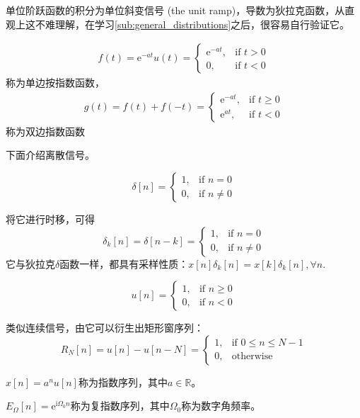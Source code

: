 \documentclass{ctexbook}
\begin{document}
单位阶跃函数的积分为单位斜变信号 (the unit ramp)，导数为狄拉克函数，从直观上这不难理解，在学习\ref{sub:general_distributions}之后，很容易自行验证它。

\begin{definition}[单边指数函数和双边指数函数]
    \begin{align*}
    f(t)=\mathrm{e}^{-at}u(t)=\begin{cases}
        \mathrm{e}^{-at}, & \text{if }t>0 \\
        0,       & \text{if }t<0
    \end{cases}
\end{align*}
称为单边按指数函数，
\begin{align*}g(t)=f(t)+f(-t)=\begin{cases}
        \mathrm{e}^{-at}, & \text{if }t\geq 0 \\
        \mathrm{e}^{at},  & \text{if }t<0
    \end{cases}
\end{align*}
称为双边指数函数
\end{definition}

下面介绍离散信号。
\begin{definition}
    \[\delta[n]=\begin{cases}
        1, & \text{if }n=0     \\
        0, & \text{if }n\neq 0
    \end{cases}\]
\end{definition}
将它进行时移，可得\[\delta_k[n]=\delta[n-k]=\begin{cases}
        1, & \text{if }n=0     \\
        0, & \text{if }n\neq 0
    \end{cases}\]
它与狄拉克$\delta$函数一样，都具有采样性质：$x[n]\delta_k[n]=x[k]\delta_k[n],\forall n$.
\begin{definition}[单位阶跃序列]
    \[u[n]=\begin{cases}
        1, & \text{if }n\geq 0 \\
        0, & \text{if }n< 0
    \end{cases}\]
\end{definition}
类似连续信号，由它可以衍生出矩形窗序列：
\[R_N[n]=u[n]-u[n-N]=\begin{cases}
        1, & \text{if }0\leq n\leq N-1 \\
        0, & \text{otherwise}
    \end{cases}\]

\begin{definition}[指数序列]
    $x[n]=a^n u[n]$称为指数序列，其中$a\in\mathbb{R}$。
\end{definition}
\begin{definition}[复指数序列]
    $E_{\Omega}[n]=\mathrm{e}^{\mathrm{i}\Omega_0 n}$称为复指数序列，其中$\Omega_0$称为数字角频率。
\end{definition}
\end{document}
